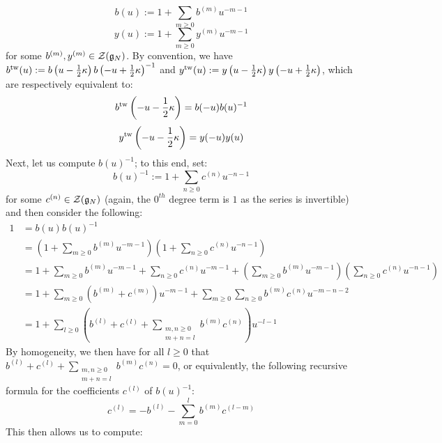                 $$b(u) := 1 + \sum_{m \geq 0} b^{(m)} u^{-m - 1}$$
                $$y(u) := 1 + \sum_{m \geq 0} y^{(m)} u^{-m - 1}$$
            for some $b^{(m)}, y^{(m)} \in \mathcal{Z}(\mathfrak{g}_N)$. By convention, we have $b^{\mathrm{tw}}(u) := b\left( u - \frac12 \kappa \right) b\left( -u + \frac12 \kappa \right)^{-1}$ and $y^{\mathrm{tw}}(u) := y\left( u - \frac12 \kappa \right) y\left( -u + \frac12 \kappa \right)$, which are respectively equivalent to:
                $$b^{\mathrm{tw}}\left( -u - \frac12 \kappa \right) = b(-u) b(u)^{-1}$$
                $$y^{\mathrm{tw}}\left( -u - \frac12 \kappa \right) = y(-u) y(u)$$
            Next, let us compute $b(u)^{-1}$; to this end, set:
                $$b(u)^{-1} := 1 + \sum_{n \geq 0} c^{(n)} u^{-n - 1}$$
            for some $c^{(n)} \in \mathcal{Z}(\mathfrak{g}_N)$ (again, the $0^{th}$ degree term is $1$ as the series is invertible) and then consider the following:
                $$
                    \begin{aligned}
                        1 & = b(u) b(u)^{-1}
                        \\
                        & = \left( 1 + \sum_{m \geq 0} b^{(m)} u^{-m - 1} \right) \left( 1 + \sum_{n \geq 0} c^{(n)} u^{-n - 1} \right)
                        \\
                        & = 1 + \sum_{m \geq 0} b^{(m)} u^{-m - 1} + \sum_{n \geq 0} c^{(n)} u^{-m - 1} + \left( \sum_{m \geq 0} b^{(m)} u^{-m - 1} \right) \left( \sum_{n \geq 0} c^{(n)} u^{-n - 1} \right)
                        \\
                        & = 1 + \sum_{m \geq 0} ( b^{(m)} + c^{(m)} ) u^{-m - 1} + \sum_{m \geq 0} \sum_{n \geq 0} b^{(m)} c^{(n)} u^{-m - n - 2}
                        \\
                        & = 1 + \sum_{l \geq 0} \left( b^{(l)} + c^{(l)} + \sum_{ \substack{m, n \geq 0 \\ m + n = l} } b^{(m)} c^{(n)} \right) u^{-l - 1}
                    \end{aligned}
                $$
            By homogeneity, we then have for all $l \geq 0$ that $b^{(l)} + c^{(l)} + \sum_{ \substack{m, n \geq 0 \\ m + n = l} } b^{(m)} c^{(n)} = 0$, or equivalently, the following recursive formula for the coefficients $c^{(l)}$ of $b(u)^{-1}$:
                $$c^{(l)} = -b^{(l)} - \sum_{m = 0}^l b^{(m)} c^{(l - m)}$$
            This then allows us to compute:
